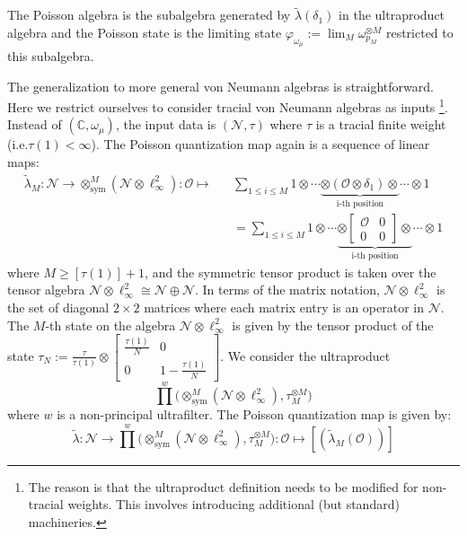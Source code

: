 \documentclass[a4paper,11pt]{article}
\theoremstyle{definition}
\numberwithin{equation}{section}
\newcommand{\nn}{\nonumber}
\begin{document}
The Poisson algebra is the subalgebra generated by $\widetilde{\lambda}(\delta_1)$ in the ultraproduct algebra and the Poisson state is the limiting state $\varphi_{\omega_\mu}:=\lim_M \omega_{p_M}^{\otimes M}$ restricted to this subalgebra.

The generalization to more general von Neumann algebras is straightforward. Here we restrict ourselves to consider tracial von Neumann algebras as inputs \footnote{The reason is that the ultraproduct definition needs to be modified for non-tracial weights. This involves introducing additional (but standard) machineries.}. Instead of $(\mathbb{C}, \omega_\mu)$, the input data is $(\mathcal{N},\tau)$ where $\tau$ is a tracial finite weight (i.e.$\tau(1)<\infty$). The Poisson quantization map again is a sequence of linear maps:
\begin{eqnarray}\label{equation:qpoissquant}
    \widetilde{\lambda}_M: \mathcal{N}\rightarrow \otimes_\text{sym}^M(\mathcal{N}\otimes\ell_\infty^2):\mathcal{O}\mapsto &&\sum_{1\leq i\leq M}1\otimes\cdots\underbrace{\otimes(\mathcal{O}\otimes\delta_1)\otimes}_\text{i-th position}\cdots\otimes 1 \nn\\
    &&= \sum_{1\leq i\leq M}1\otimes\cdots\underbrace{\otimes\begin{bmatrix}
        \mathcal{O}&0\\0&0
    \end{bmatrix}\otimes}_\text{i-th position}\cdots\otimes 1
\end{eqnarray}
where $M \geq [\tau(1)] + 1$, and the symmetric tensor product is taken over the tensor algebra $\mathcal{N}\otimes\ell_\infty^2\cong\mathcal{N}\oplus\mathcal{N}$. In terms of the matrix notation, $\mathcal{N}\otimes\ell_\infty^2$ is the set of diagonal $2\times2$ matrices where each matrix entry is an operator in $\mathcal{N}$. The $M$-th state on the algebra $\mathcal{N}\otimes\ell_\infty^2$ is given by the tensor product of the state $\tau_N:=\frac{\tau}{\tau(1)}\otimes\begin{bmatrix}
    \frac{\tau(1)}{N}&0\\0&1-\frac{\tau(1)}{N}
\end{bmatrix}$. We consider the ultraproduct 
\begin{equation}
    \prod^w \big(\otimes_\text{sym}^M(\mathcal{N}\otimes\ell_\infty^2), \tau_M^{\otimes M}\big)
\end{equation}
where $w$ is a non-principal ultrafilter. The Poisson quantization map is given by:
\begin{equation}
    \widetilde{\lambda}:\mathcal{N}\rightarrow \prod^w\big(\otimes_\text{sym}^M(\mathcal{N}\otimes\ell_\infty^2), \tau_M^{\otimes M}\big):\mathcal{O}\mapsto [(\widetilde{\lambda}_M(\mathcal{O}))]
\end{equation}
\end{document}
